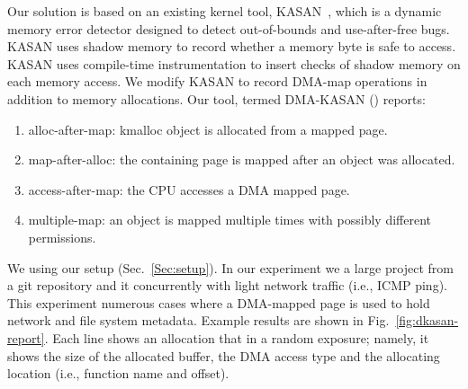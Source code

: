 Our solution is based on an existing kernel tool, KASAN~\cite{kasan}, which is a dynamic memory error detector designed to detect out-of-bounds and use-after-free bugs. KASAN uses shadow memory to record whether a memory byte is safe to access. KASAN uses compile-time instrumentation to insert checks of shadow memory on each memory access. 
We modify KASAN to record DMA-map operations in addition to memory allocations. Our tool, termed DMA-KASAN (\dkasan) reports: 
\begin{enumerate}
    \item alloc-after-map:  kmalloc object is allocated from a mapped page.
    \item map-after-alloc:  the containing page is mapped after an object was allocated.
    \item access-after-map: the CPU accesses a DMA mapped page.
    \item multiple-map: an object is mapped multiple times with possibly different permissions.
\end{enumerate}
We \DIFdelbegin {}\DIFdelend \DIFaddbegin {}\DIFaddend \dkasan using our setup (Sec.~\ref{Sec:setup}).
In our experiment we \DIFdelbegin {}\DIFdelend \DIFaddbegin {}\DIFaddend a large project from a git repository and \DIFdelbegin {}\DIFdelend \DIFaddbegin {}\DIFaddend it concurrently with light network traffic (i.e., ICMP ping). This experiment \DIFdelbegin {}\DIFdelend \DIFaddbegin {}\DIFaddend numerous cases where a DMA-mapped page is used to hold network and file system metadata. Example results are shown in Fig.~\ref{fig:dkasan-report}. Each line shows an allocation that \DIFdelbegin {}\DIFdelend \DIFaddbegin {}\DIFaddend in a random exposure; namely, it shows the size of the allocated buffer, the DMA access type and the allocating location (i.e., function name and offset).

